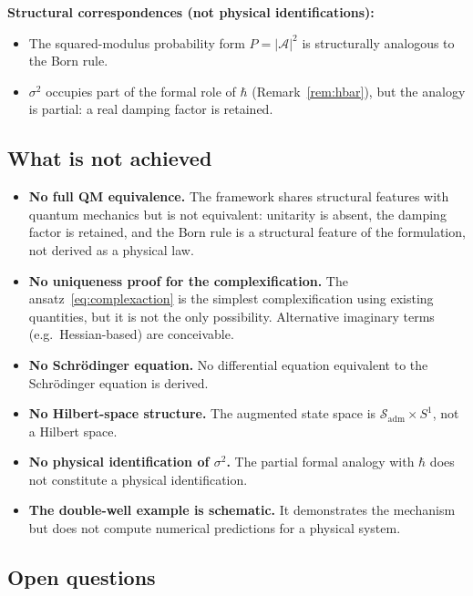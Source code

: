 \documentclass[12pt]{article}
\newcommand{\Sadm}{\mathcal{S}_{\mathrm{adm}}}
\begin{document}
\textbf{Structural correspondences (not physical identifications):}
\begin{itemize}
    \item The squared-modulus probability form $P = |\mathcal{A}|^2$ is structurally analogous to the Born rule.
    \item $\sigma^2$ occupies part of the formal role of $\hbar$ (Remark~\ref{rem:hbar}), but the analogy is partial: a real damping factor is retained.
\end{itemize}

\subsection{What is not achieved}

\begin{itemize}
    \item \textbf{No full QM equivalence.} The framework shares structural features with quantum mechanics but is not equivalent: unitarity is absent, the damping factor is retained, and the Born rule is a structural feature of the formulation, not derived as a physical law.
    \item \textbf{No uniqueness proof for the complexification.} The ansatz~\eqref{eq:complexaction} is the simplest complexification using existing quantities, but it is not the only possibility. Alternative imaginary terms (e.g.\ Hessian-based) are conceivable.
    \item \textbf{No Schr\"odinger equation.} No differential equation equivalent to the Schr\"odinger equation is derived.
    \item \textbf{No Hilbert-space structure.} The augmented state space is $\Sadm \times S^1$, not a Hilbert space.
    \item \textbf{No physical identification of $\sigma^2$.} The partial formal analogy with $\hbar$ does not constitute a physical identification.
    \item \textbf{The double-well example is schematic.} It demonstrates the mechanism but does not compute numerical predictions for a physical system.
\end{itemize}

\subsection{Open questions}
\end{document}
